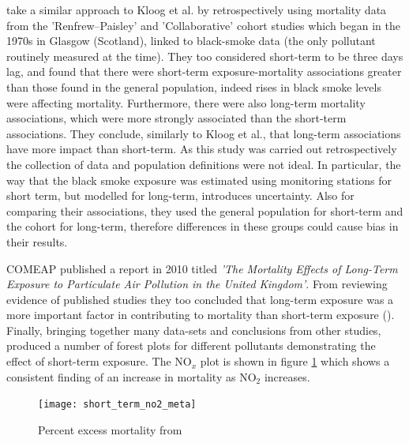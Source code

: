 \cite{Beverland2012a} take a similar approach to Kloog et al. by retrospectively using mortality data from the 'Renfrew--Paisley' and 'Collaborative' cohort studies which began in the 1970s in Glasgow (Scotland), linked to black-smoke data (the only pollutant routinely measured at the time). They too considered short-term to be three days lag, and found that there were short-term exposure-mortality associations greater than those found in the general population, indeed rises in black smoke levels were affecting mortality. Furthermore, there were also long-term mortality associations, which were more strongly associated than the short-term associations. They conclude, similarly to Kloog et al., that long-term associations have more impact than short-term. As this study was carried out retrospectively the collection of data and population definitions were not ideal. In particular, the way that the black smoke exposure was estimated using monitoring stations for short term, but modelled for long-term, introduces uncertainty. Also for comparing their associations, they used the general population for short-term and the cohort for long-term, therefore differences in these groups could cause bias in their results.

COMEAP published a report in 2010 titled \textit{'The Mortality Effects of Long-Term Exposure to Particulate Air Pollution in the United Kingdom'}. From reviewing evidence of published studies they too concluded that long-term exposure was a more important factor in contributing to mortality than short-term exposure (\cite{CommitteeontheMedicalEffectsofAirPollution2010}). Finally, bringing together many data-sets and conclusions from other studies, \cite{Stieb2002} produced a number of forest plots for different pollutants demonstrating the effect of short-term exposure. The NO$_{x}$ plot is shown in figure \ref{fig:short_term_no2_meta} which shows a consistent finding of an increase in mortality as NO$_{2}$ increases.

\begin{figure}[H]
\centering
\texttt{[image: short\_term\_no2\_meta]}
\caption{ Percent excess mortality from \cite{Stieb2002}}
\label{fig:short_term_no2_meta}
\end{figure}

